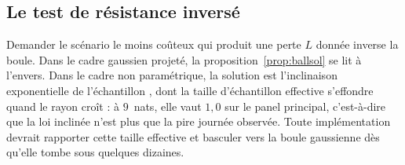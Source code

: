 \subsection{Le test de résistance inversé}

Demander le scénario le moins coûteux qui produit une perte $L$ donnée inverse
la boule. Dans le cadre gaussien projeté, la
proposition~\ref{prop:ballsol} se lit à l'envers. Dans le cadre non
paramétrique, la solution est l'inclinaison exponentielle de l'échantillon
\citep{csiszar1975}, dont la taille d'échantillon effective s'effondre quand le
rayon croît : à $9$~nats, elle vaut $1{,}0$ sur le panel principal, c'est-à-dire
que la loi inclinée n'est plus que la pire journée observée. Toute
implémentation devrait rapporter cette taille effective et basculer vers la
boule gaussienne dès qu'elle tombe sous quelques dizaines.
